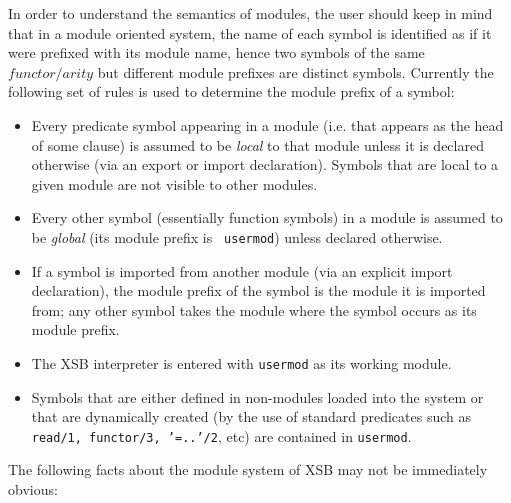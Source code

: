 In order to understand the semantics of modules, the user should keep in
mind that in a module oriented system, the name of each symbol is identified
as if it were prefixed with its module name, hence two symbols of the same
$functor/arity$ but different module prefixes are distinct symbols.  
Currently the following set of rules is used to determine the module 
prefix of a symbol:
\begin{itemize}
\item	Every predicate symbol appearing in a module (i.e. that appears as
	the head of some clause) is assumed to be {\em local} to that
	module unless it is declared otherwise (via an export or
	import declaration).  Symbols that are local to a given module
	are not visible to other modules.
\item	Every other symbol (essentially function symbols) in a module is
	assumed to be {\em global} (its module prefix is {\tt
	usermod}) unless declared otherwise.
\item	If a symbol is imported from another module (via an explicit import 
	declaration), the module prefix of the symbol is the module it is 
	imported from; any other symbol takes the module where the symbol 
	occurs as its module prefix.
\item	The XSB interpreter is entered with {\tt usermod} as its 
	working module.
\item	Symbols that are either defined in non-modules loaded into the
	system or that are dynamically created (by the use of standard
	predicates such as {\tt read/1, functor/3, '=..'/2}, etc) are
	contained in {\tt usermod}.
\end{itemize}
%
The following facts about the module system of XSB may not be
immediately obvious:
